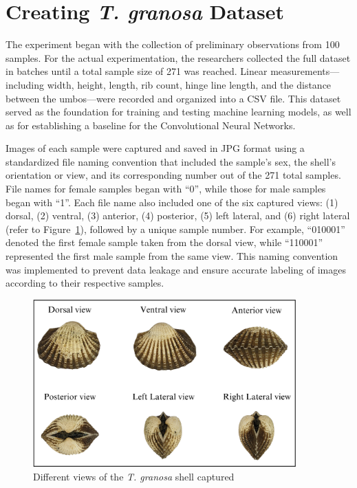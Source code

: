 \section{Creating \textit{T. granosa} Dataset}
\label{sec:dataset}

The experiment began with the collection of preliminary observations from 100 \Tgranosa samples. For the actual experimentation, the researchers collected the full dataset in batches until a total sample size of 271 \Tgranosa was reached. Linear measurements—including width, height, length, rib count, hinge line length, and the distance between the umbos—were recorded and organized into a CSV file. This dataset served as the foundation for training and testing machine learning models, as well as for establishing a baseline for the Convolutional Neural Networks.

Images of each sample were captured and saved in JPG format using a standardized file naming convention that included the sample's sex, the shell's orientation or view, and its corresponding number out of the 271 total samples. File names for female \Tgranosa samples began with “0”, while those for male samples began with “1”. Each file name also included one of the six captured views: (1) dorsal, (2) ventral, (3) anterior, (4) posterior, (5) left lateral, and (6) right lateral (refer to Figure~\ref{fig:granosa_views}), followed by a unique sample number. For example, “010001” denoted the first female sample taken from the dorsal view, while “110001” represented the first male sample from the same view. This naming convention was implemented to prevent data leakage and ensure accurate labeling of images according to their respective samples.

\begin{figure}[!htbp]
	\centering
	\includegraphics[width=0.9\textwidth]{figures/view.png}
	\caption{Different views of the \textit{T. granosa} shell captured}
	\label{fig:granosa_views}
\end{figure}

